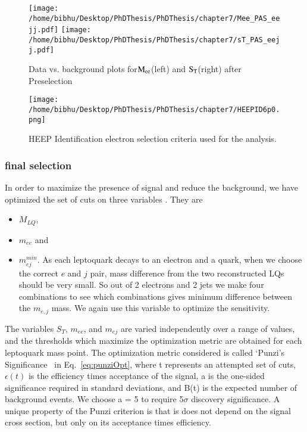 \begin{figure}[h]
\centering
\texttt{[image: /home/bibhu/Desktop/PhDThesis/PhDThesis/chapter7/Mee\_PAS\_eejj.pdf]}
\texttt{[image: /home/bibhu/Desktop/PhDThesis/PhDThesis/chapter7/sT\_PAS\_eejj.pdf]}
\caption{\label{figure:DatavsBkgPreselection}Data vs. background plots for$\rm M_{ee}$(left) and $\rm S_{T}$(right) after Preselection}
\end{figure}



\begin{figure}[h]
\begin{center}
\texttt{[image: /home/bibhu/Desktop/PhDThesis/PhDThesis/chapter7/HEEPID6p0.png]}

\caption{\label{fig:HEEPID6p0} HEEP Identification electron selection criteria used for the analysis.}
\end{center}
\end{figure}



\newpage
\subsubsection{final selection}
In order to maximize the presence of signal and reduce the background, we have optimized the set of cuts on three variables . They are 
\begin{itemize}
 \item $M_{LQ}$,
 \item  $m_{ee}$ and
 \item  $m_{ej}^{min}$. As each leptoquark decays to an electron and a quark, when we choose the correct $e$ and $j$ pair, mass difference from the two reconstructed LQs should be very small. So out of 2 electrons and 2 jets we make four combinations to see which combinations gives minimum difference between the $m_{e,j}$ mass. We again use this variable to optimize the sensitivity.
\end{itemize}

The variables $S_T$, $m_{ee}$, and $m_{ej}$ are varied independently over a range of values, and the thresholds which maximize the optimization metric are obtained for each leptoquark mass point. The optimization metric considered is called `Punzi's Significance~\cite{PunziSignificance} in Eq.~\ref{eq:punziOpt}, where t represents an attempted set of cuts, $\epsilon(t)$ is the efficiency times acceptance of the signal, a is the one-sided significance required in standard deviations, and B(t) is the expected number of background events. We choose a = 5 to require 5$\sigma$ discovery significance. A unique property of the Punzi criterion is that is does not depend on the signal cross section, but only on its acceptance times efficiency. 


